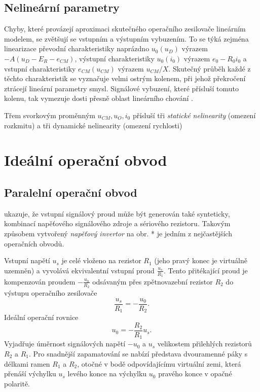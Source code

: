     \subsection{Nelineární parametry}
      Chyby, které provázejí aproximaci skutečného operačního zesilovače lineár\-ním modelem, se 
      zvětšují se vstupním a výstupním vybuzením. To se týká zejména linearizace převodní 
      charakteristiky naprázdno $u_0(u_D)$ výrazem $-A(u_D-E_R-e_{CM})$, výstupní charakteristiky 
      $u_0(i_0)$ výrazem $e_0-R_0i_0$ a vstupní charakteristiky $e_{CM}(u_{CM})$ výrazem 
      $u_{CM}/X$.  Skutečný průběh každé z těchto charakteristik se vyznačuje velmi ostrým kolenem, 
      při jehož překročení ztrácejí lineární parametry smysl.  Signálové vybuzení, které přísluší 
      tomuto kolenu, tak vymezuje dosti přesně oblast lineárního chování \cite[s.~29]{Dostal}.
  
      Třem svorkovým proměnným $u_{CM}, u_O, i_0$ přísluší tři \emph{statické nelinearity} (omezení 
      rozkmitu) a tři dynamické nelinearity (omezení rychlosti)
  
  \section{Ideální operační obvod}
    \subsection{Paralelní operační obvod}
       ukazuje, že vstupní signálový proud může být generován také 
      synteticky, kombinací napěťového signálového zdroje a sériového rezistoru. Takovým způsobem 
      vytvořený \emph{napěťový invertor} na obr. * je jedním z nejčastějších operačních obvodů. 
      
      Vstupní napětí $u_s$ je celé vloženo na rezistor $R_1$ (jeho pravý konec je virtuálně 
      uzemněn) a vyvolává ekvivalentní vstupní proud $\frac{u_s}{R_1}$. Tento přitékající proud je 
      kompenzován proudem $-\frac{u_0}{R_2}$ odsávaným přes zpětnovazební rezistor $R_2$ do výstupu 
      operačního zesilovače $$\frac{u_s}{R_1}=-\frac{u_0}{R_2}.$$ Ideální operační rovnice
      \begin{equation}\label{AES:eq_opamp_inv02}
        u_0 = - \frac{R_2}{R_1}u_s.
      \end{equation}
      Vyjadřuje úměrnost signálových napětí $-u_0$ a $u_s$ velikostem přilehlých rezistorů $R_2$ a 
      $R_1$. Pro snadnější zapamatování se nabízí představa dvouramenné páky s délkami ramen $R_1$ 
      a $R_2$, otočné v bodě odpovídajícímu virtuální zemi, která přenáší výchylku $u_s$ levého 
      konce na výchylku $u_0$ pravého konce v opačné polaritě.

